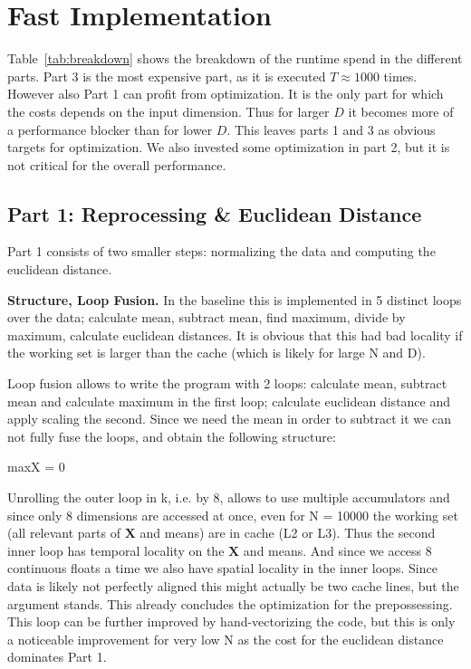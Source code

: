 \documentclass[letterpaper]{article}
\newcommand{\mypar}[1]{{\bf #1.}}
\begin{document}
\section{Fast Implementation}\label{sec:fastImplementation}

Table~\ref{tab:breakdown} shows the breakdown of the runtime spend in the different parts. Part 3 is the most expensive part, as it is executed $T \approx 1000$ times. However also Part 1 can profit from optimization. It is the only part for which the costs depends on the input dimension. Thus for larger $D$ it becomes more of a performance blocker than for lower $D$. This leaves parts 1 and 3 as obvious targets for optimization. We also invested some optimization in part 2, but it is not critical for the overall performance.


\subsection{Part 1: Reprocessing \& Euclidean Distance}

Part 1 consists of two smaller steps: normalizing the data and computing the euclidean distance.

\mypar{Structure, Loop Fusion}
In the baseline this is implemented in 5 distinct loops over the data; calculate mean, subtract mean, find maximum, divide by maximum, calculate euclidean distances.
It is obvious that this had bad locality if the working set is larger than the cache (which is likely for large N and D).

Loop fusion allows to write the program with 2 loops: calculate mean, subtract mean and calculate maximum in the first loop; calculate euclidean distance and apply scaling the second. Since we need the mean in order to subtract it we can not fully fuse the loops, and obtain the following structure:


\begin{algorithm} \footnotesize
    maxX = 0 \;
\end{algorithm}


Unrolling the outer loop in k, i.e. by 8, allows to use multiple accumulators and since only 8 dimensions are accessed at once, even for N = 10000 the working set (all relevant parts of $\mathbf{X}$ and means) are in cache (L2 or L3). Thus the second inner loop has temporal locality on the $\mathbf{X}$ and means. And since we access 8 continuous floats a time we also have spatial locality in the inner loops. Since data is likely not perfectly aligned this might actually be two cache lines, but the argument stands.
This already concludes the optimization for the prepossessing. This loop can be further improved by hand-vectorizing the code, but this is only a noticeable improvement for very low N as the cost for the euclidean distance dominates Part 1.
\end{document}
